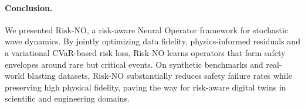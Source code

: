 \documentclass{article}
\theoremstyle{plain}
\theoremstyle{definition}
\theoremstyle{remark}
\begin{document}
\paragraph{Conclusion.}
We presented Risk-NO, a risk-aware Neural Operator framework for stochastic wave dynamics. By jointly optimizing data fidelity, physics-informed residuals and a variational CVaR-based risk loss, Risk-NO learns operators that form safety envelopes around rare but critical events. On synthetic benchmarks and real-world blasting datasets, Risk-NO substantially reduces safety failure rates while preserving high physical fidelity, paving the way for risk-aware digital twins in scientific and engineering domains.



\end{document}
